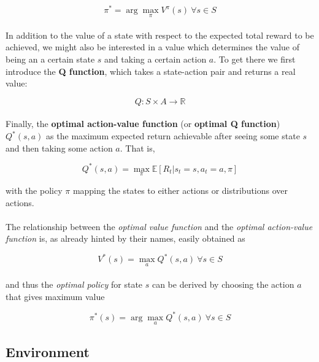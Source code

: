 \begin{equation}\label{eq:value-function-policy}
\pi^{*}=\arg\max_{\pi}V^{\pi}(s)\ \forall{s}\in{S}
\end{equation}
\\
In addition to the value of a state with respect to the expected total reward to be achieved, we might also be interested in a value which determines the value of being an a certain state $s$ and taking a certain action $a$. 
To get there we first introduce the \textbf{Q function}, which takes a state-action pair and returns a real value:

\begin{equation}\label{eq:q-function}
Q:S\times{A}\rightarrow{\mathbb{R}}
\end{equation}
\\
Finally, the \textbf{optimal action-value function} (or \textbf{optimal Q function}) $Q^*(s,a)$ as the maximum expected return achievable after seeing some state $s$ and then taking some action $a$. That is, 

\begin{equation}\label{eq:optimal-action-value-function}
Q^*(s,a)=\max_{\pi}\mathbb{E} [ R_t | s_t=s, a_t=a, \pi ]
\end{equation}

with the policy $\pi$ mapping the states to either actions or distributions over actions. 
\\
\\
The relationship between the \textit{optimal value function} and the \textit{optimal action-value function} is, as already hinted by their names, easily obtained as

\begin{equation}
V^*(s)=\max_{a}Q^*(s,a)\ \forall{s}\in{S}
\end{equation}
\\
and thus the \textit{optimal policy} for state $s$ can be derived by choosing the action $a$ that gives maximum value

\begin{equation}
\pi^*(s)=\arg \max_{a} Q^*(s, a)\ \forall{s}\in{S}
\end{equation}

\subsection{Environment}

